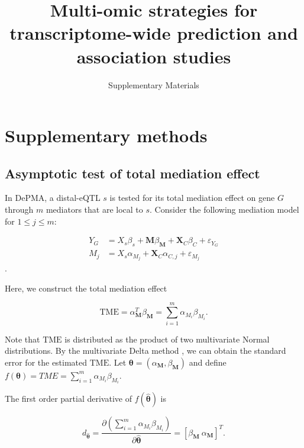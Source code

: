 \documentclass[11pt]{article}
\begin{document}
 
 
\title{Multi-omic strategies for transcriptome-wide prediction
    and association studies}
\author{Supplementary Materials} 
    \date{}
 
\maketitle

\section{Supplementary methods}

\subsection{Asymptotic test
of total mediation effect}


In DePMA, a distal-eQTL $s$
is tested for its total mediation effect on gene $G$
through $m$ mediators that are local to $s$.
Consider the following
mediation model for $1 \leq j \leq m$:

\begin{equation}\label{mediationeqn}
\begin{split}
Y_G & = X_s\beta_s + \mathbf{M}\beta_{\mathbf{M}} + \mathbf{X}_C\beta_{C} + \varepsilon_{Y_G} \\
M_j & = X_s\alpha_{M_j} + \mathbf{X}_C\alpha_{C,j} + \varepsilon_{M_j}
\end{split}
\end{equation}.

Here, we construct the total mediation effect 

$$\text{TME} = 
\alpha_{\mathbf{M}}^T\beta_{\mathbf{M}} = 
\sum_{i=1}^{m}\alpha_{M_i}\beta_{M_i}.$$

Note that $\text{TME}$ is distributed
as the product of two multivariate Normal
distributions. By the multivariate
Delta method \cite{Bishop}, we can obtain the
standard error for the estimated
$\text{TME}$. Let 
$\boldsymbol{\theta} = (\alpha_\mathbf{M},\beta_\mathbf{M})$
and define $f(\boldsymbol{\theta}) = TME = 
\sum_{i=1}^{m}\alpha_{M_i}\beta_{M_i}$.

The first order partial derivative
of $f(\hat{\boldsymbol{\theta}})$
is

$$d_{\hat{\boldsymbol{\theta}}} = \frac{\partial(\sum_{i=1}^{m}\alpha_{M_i}\beta_{M_i})}{\partial{\hat{\boldsymbol{\theta}}}} = [\beta_{\mathbf{M}}~\alpha_{\mathbf{M}}]^T.$$
\end{document}
